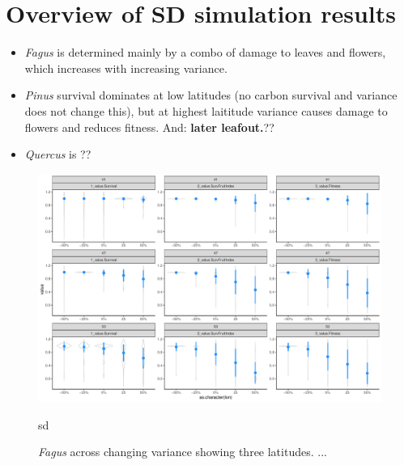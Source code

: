 \documentclass[11pt,letter]{article}
\begin{document}
\newpage
\section{Overview of SD simulation results}

\begin{itemize}
\item \emph{Fagus} is determined mainly by a combo of damage to leaves and flowers, which increases with increasing variance. 
\item \emph{Pinus} survival dominates at low latitudes (no carbon survival and variance does not change this), but at highest laititude variance causes damage to flowers and reduces fitness. And: {\bf later leafout.}??
\item \emph{Quercus} is ?? 
\end{itemize}


\begin{figure} 
 \begin{center}
\noindent \includegraphics[width=1\textwidth]{..//analyses/graphs/phenofit/sims/metrics3/sdsim_3metricsFS.pdf}
  \caption{\emph{Fagus} across changing variance showing three latitudes. ...}
  \label{fig:fagussd3}sd
  \end{center}
\end{figure}
\end{document}
